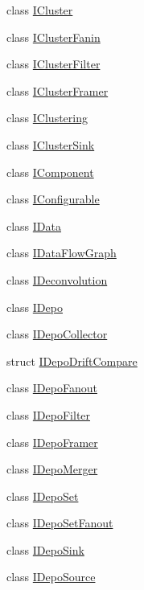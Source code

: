 \begin{DoxyCompactItemize}
\item 
class \hyperlink{class_wire_cell_1_1_i_cluster}{I\+Cluster}
\item 
class \hyperlink{class_wire_cell_1_1_i_cluster_fanin}{I\+Cluster\+Fanin}
\item 
class \hyperlink{class_wire_cell_1_1_i_cluster_filter}{I\+Cluster\+Filter}
\item 
class \hyperlink{class_wire_cell_1_1_i_cluster_framer}{I\+Cluster\+Framer}
\item 
class \hyperlink{class_wire_cell_1_1_i_clustering}{I\+Clustering}
\item 
class \hyperlink{class_wire_cell_1_1_i_cluster_sink}{I\+Cluster\+Sink}
\item 
class \hyperlink{class_wire_cell_1_1_i_component}{I\+Component}
\item 
class \hyperlink{class_wire_cell_1_1_i_configurable}{I\+Configurable}
\item 
class \hyperlink{class_wire_cell_1_1_i_data}{I\+Data}
\item 
class \hyperlink{class_wire_cell_1_1_i_data_flow_graph}{I\+Data\+Flow\+Graph}
\item 
class \hyperlink{class_wire_cell_1_1_i_deconvolution}{I\+Deconvolution}
\item 
class \hyperlink{class_wire_cell_1_1_i_depo}{I\+Depo}
\item 
class \hyperlink{class_wire_cell_1_1_i_depo_collector}{I\+Depo\+Collector}
\item 
struct \hyperlink{struct_wire_cell_1_1_i_depo_drift_compare}{I\+Depo\+Drift\+Compare}
\item 
class \hyperlink{class_wire_cell_1_1_i_depo_fanout}{I\+Depo\+Fanout}
\item 
class \hyperlink{class_wire_cell_1_1_i_depo_filter}{I\+Depo\+Filter}
\item 
class \hyperlink{class_wire_cell_1_1_i_depo_framer}{I\+Depo\+Framer}
\item 
class \hyperlink{class_wire_cell_1_1_i_depo_merger}{I\+Depo\+Merger}
\item 
class \hyperlink{class_wire_cell_1_1_i_depo_set}{I\+Depo\+Set}
\item 
class \hyperlink{class_wire_cell_1_1_i_depo_set_fanout}{I\+Depo\+Set\+Fanout}
\item 
class \hyperlink{class_wire_cell_1_1_i_depo_sink}{I\+Depo\+Sink}
\item 
class \hyperlink{class_wire_cell_1_1_i_depo_source}{I\+Depo\+Source}
\item 

\end{DoxyCompactItemize}

